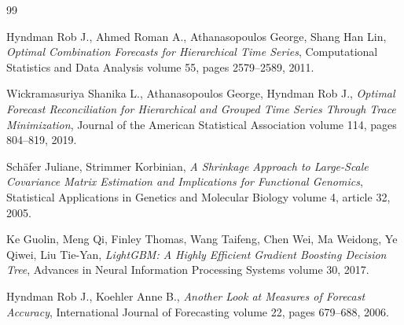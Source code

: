 \documentclass[11pt]{book}
\begin{document}
\renewcommand{\bibname}{References}
\begin{thebibliography}{99}

 Hyndman Rob J., Ahmed Roman A., Athanasopoulos George, Shang Han Lin,
{\em Optimal Combination Forecasts for Hierarchical Time Series},
Computational Statistics and Data Analysis volume 55, pages 2579--2589, 2011.

 Wickramasuriya Shanika L., Athanasopoulos George, Hyndman Rob J.,
{\em Optimal Forecast Reconciliation for Hierarchical and Grouped Time Series Through
Trace Minimization}, Journal of the American Statistical Association volume 114,
pages 804--819, 2019.

 Sch\"afer Juliane, Strimmer Korbinian,
{\em A Shrinkage Approach to Large-Scale Covariance Matrix Estimation and Implications
for Functional Genomics}, Statistical Applications in Genetics and Molecular Biology
volume 4, article 32, 2005.

 Ke Guolin, Meng Qi, Finley Thomas, Wang Taifeng, Chen Wei, Ma Weidong,
Ye Qiwei, Liu Tie-Yan, {\em LightGBM: A Highly Efficient Gradient Boosting Decision Tree},
Advances in Neural Information Processing Systems volume 30, 2017.

 Hyndman Rob J., Koehler Anne B.,
{\em Another Look at Measures of Forecast Accuracy},
International Journal of Forecasting volume 22, pages 679--688, 2006.


\end{thebibliography}

\appendix

\end{document}
